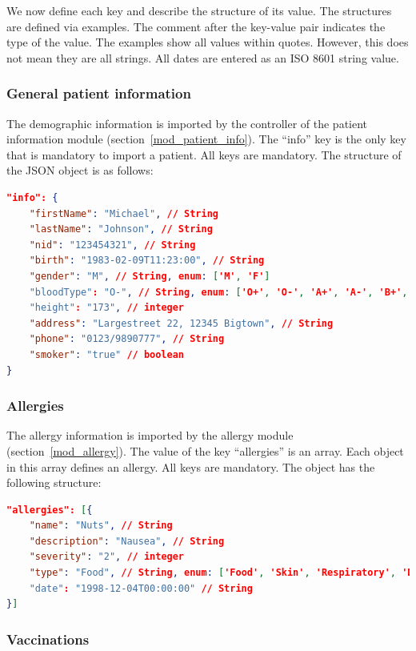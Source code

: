     We now define each key and describe the structure of its value. The structures are defined via examples. The comment after the key-value pair indicates the type of the value. The examples show all values within quotes. However, this does not mean they are all strings. All dates are entered as an ISO 8601 string value.

    \subsubsection{General patient information}

    The demographic information is imported by the controller of the patient information module (section~\ref{mod_patient_info}). The ``info'' key is the only key that is mandatory to import a patient. All keys are mandatory. The structure of the JSON object is as follows:

\begin{lstlisting}[language=json,firstnumber=1]
"info": {
    "firstName": "Michael", // String
    "lastName": "Johnson", // String
    "nid": "123454321", // String
    "birth": "1983-02-09T11:23:00", // String
    "gender": "M", // String, enum: ['M', 'F']
    "bloodType": "O-", // String, enum: ['O+', 'O-', 'A+', 'A-', 'B+', 'B-', 'AB+', 'AB-']
    "height": "173", // integer
    "address": "Largestreet 22, 12345 Bigtown", // String
    "phone": "0123/9890777", // String
    "smoker": "true" // boolean
}
\end{lstlisting}

    \subsubsection{Allergies}

    The allergy information is imported by the allergy module (section~\ref{mod_allergy}). The value of the key ``allergies'' is an array. Each object in this array defines an allergy. All keys are mandatory. The object has the following structure:

\begin{lstlisting}[language=json,firstnumber=1]
"allergies": [{
    "name": "Nuts", // String
    "description": "Nausea", // String
    "severity": "2", // integer
    "type": "Food", // String, enum: ['Food', 'Skin', 'Respiratory', 'Drug', 'Other']
    "date": "1998-12-04T00:00:00" // String
}]
\end{lstlisting}

    \subsubsection{Vaccinations}

